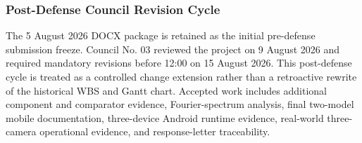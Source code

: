 \documentclass[12pt,a4paper]{report}
\newenvironment{revisionblock}{\begin{snugshade}\noindent}{\end{snugshade}}
\begin{document}
\subsubsection{\texorpdfstring{\colorbox{RevisionYellow}{Post-Defense Council Revision Cycle}}{Post-Defense Council Revision Cycle}}
\begin{revisionblock}
The 5 August 2026 DOCX package is retained as the initial pre-defense submission freeze. Council No. 03 reviewed the project on 9 August 2026 and required mandatory revisions before 12:00 on 15 August 2026. This post-defense cycle is treated as a controlled change extension rather than a retroactive rewrite of the historical WBS and Gantt chart. Accepted work includes additional component and comparator evidence, Fourier-spectrum analysis, final two-model mobile documentation, three-device Android runtime evidence, real-world three-camera operational evidence, and response-letter traceability.
\end{revisionblock}
\end{document}
